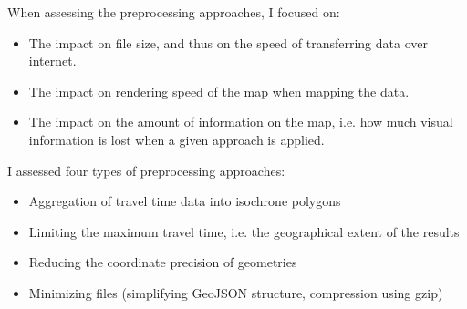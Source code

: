 When assessing the preprocessing approaches, I focused on:
\begin{itemize}
	\item The impact on file size, and thus on the speed of transferring data over internet.
	\item The impact on rendering speed of the map when mapping the data.
	\item The impact on the amount of information on the map,
	i.e. how much visual information is lost when a given approach is applied.
\end{itemize}

I assessed four types of preprocessing approaches:
\begin{itemize}
	\item Aggregation of travel time data into isochrone polygons 
	\item Limiting the maximum travel time, i.e. the geographical extent of the results 
	\item Reducing the coordinate precision of geometries
	\item Minimizing files (simplifying GeoJSON structure, compression using gzip)
\end{itemize}

